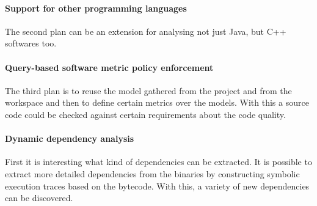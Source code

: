 \paragraph*{Support for other programming languages}
The second plan can be an extension for analysing not just Java, but C++ softwares too. 

\paragraph*{Query-based software metric policy enforcement}
The third plan is
to reuse the model gathered from the project and from the workspace and then to
define certain metrics over the models. With this a source code could be
checked against certain requirements about the code quality.

\paragraph*{Dynamic dependency analysis}
First it is interesting what kind of dependencies can be extracted.
It is possible to extract more detailed dependencies from the binaries by
constructing symbolic execution traces based on the bytecode. With this, a
variety of new dependencies can be discovered.
